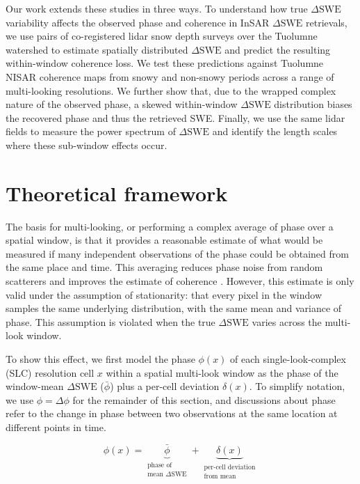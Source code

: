 \documentclass[tc, manuscript]{copernicus}
\begin{document}
Our work extends these studies in three ways. To understand how true $\Delta\mathrm{SWE}$ variability affects the observed phase and coherence in InSAR $\Delta\mathrm{SWE}$ retrievals, we use pairs of co-registered lidar snow depth surveys over the Tuolumne watershed to estimate spatially distributed $\Delta\mathrm{SWE}$ and predict the resulting within-window coherence loss. We test these predictions against Tuolumne NISAR coherence maps from snowy and non-snowy periods across a range of multi-looking resolutions. We further show that, due to the wrapped complex nature of the observed phase, a skewed within-window $\Delta\mathrm{SWE}$ distribution biases the recovered phase and thus the retrieved SWE. Finally, we use the same lidar fields to measure the power spectrum of $\Delta\mathrm{SWE}$ and identify the length scales where these sub-window effects occur.

\section{Theoretical framework}\label{sec:theoretical-framework}

The basis for multi-looking, or performing a complex average of phase over a spatial window, is that it provides a reasonable estimate of what would be measured if many independent observations of the phase could be obtained from the same place and time. This averaging reduces phase noise from random scatterers and improves the estimate of coherence \citep{Bamler1998}. However, this estimate is only valid under the assumption of stationarity: that every pixel in the window samples the same underlying distribution, with the same mean and variance of phase. This assumption is violated when the true $\Delta\mathrm{SWE}$ varies across the multi-look window.

To show this effect, we first model the phase $\phi (x)$ of each single-look-complex (SLC) resolution cell $x$ within a spatial multi-look window as the phase of the window-mean $\Delta\mathrm{SWE}$ ($\bar{\phi}$) plus a per-cell deviation $\delta (x)$. To simplify notation, we use $\phi = \Delta\phi$ for the remainder of this section, and discussions about phase refer to the change in phase between two observations at the same location at different points in time.

\begin{equation}\label{eq:sigma_def}
      \phi (x) = \underbrace{\bar{\phi}}_{\substack{\text{phase of} \\ \text{mean $\Delta\mathrm{SWE}$}}}
           + \underbrace{\delta (x)}_{\substack{\text{per-cell deviation} \\ \text{from mean}}}
\end{equation}
\end{document}
